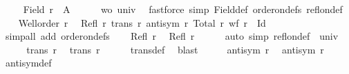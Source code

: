 \begin{isabellebody}
\ \ \isamarkupfalse%
\ {}{\isacharcolon}{\kern0pt}\ {\isachardoublequoteopen}Field\ {\isacharquery}{\kern0pt}r\ {\isacharequal}{\kern0pt}\ A{\isachardoublequoteclose}\isanewline
\ \ \ \ \isamarkupfalse%
\ wo\ univ\ \isamarkupfalse%
\ {\isacharparenleft}{\kern0pt}fastforce\ simp{\isacharcolon}{\kern0pt}\ Field{\isacharunderscore}{\kern0pt}def\ order{\isacharunderscore}{\kern0pt}on{\isacharunderscore}{\kern0pt}defs\ refl{\isacharunderscore}{\kern0pt}on{\isacharunderscore}{\kern0pt}def{\isacharparenright}{\kern0pt}\isanewline
\ \ \isamarkupfalse%
\ {\isacartoucheopen}Well{\isacharunderscore}{\kern0pt}order\ r{\isacartoucheclose}\ \isamarkupfalse%
\ {\isachardoublequoteopen}Refl\ r{\isachardoublequoteclose}\ {\isachardoublequoteopen}trans\ r{\isachardoublequoteclose}\ {\isachardoublequoteopen}antisym\ r{\isachardoublequoteclose}\ {\isachardoublequoteopen}Total\ r{\isachardoublequoteclose}\ {\isachardoublequoteopen}wf\ {\isacharparenleft}{\kern0pt}r\ {\isacharminus}{\kern0pt}\ Id{\isacharparenright}{\kern0pt}{\isachardoublequoteclose}\isanewline
\ \ \ \ \isamarkupfalse%
\ {\isacharparenleft}{\kern0pt}simp{\isacharunderscore}{\kern0pt}all\ add{\isacharcolon}{\kern0pt}\ order{\isacharunderscore}{\kern0pt}on{\isacharunderscore}{\kern0pt}defs{\isacharparenright}{\kern0pt}\isanewline
\ \ \isamarkupfalse%
\ {\isacartoucheopen}Refl\ r{\isacartoucheclose}\ \isamarkupfalse%
\ {\isachardoublequoteopen}Refl\ {\isacharquery}{\kern0pt}r{\isachardoublequoteclose}\isanewline
\ \ \ \ \isamarkupfalse%
\ {\isacharparenleft}{\kern0pt}auto\ simp{\isacharcolon}{\kern0pt}\ refl{\isacharunderscore}{\kern0pt}on{\isacharunderscore}{\kern0pt}def\ {}\ univ{\isacharparenright}{\kern0pt}\isanewline
\ \ \isamarkupfalse%
\ \isamarkupfalse%
\ {\isacartoucheopen}trans\ r{\isacartoucheclose}\ \isamarkupfalse%
\ {\isachardoublequoteopen}trans\ {\isacharquery}{\kern0pt}r{\isachardoublequoteclose}\isanewline
\ \ \ \ \isamarkupfalse%
\ trans{\isacharunderscore}{\kern0pt}def\ \isamarkupfalse%
\ blast\isanewline
\ \ \isamarkupfalse%
\ \isamarkupfalse%
\ {\isacartoucheopen}antisym\ r{\isacartoucheclose}\ \isamarkupfalse%
\ {\isachardoublequoteopen}antisym\ {\isacharquery}{\kern0pt}r{\isachardoublequoteclose}\isanewline
\ \ \ \ \isamarkupfalse%
\ antisym{\isacharunderscore}{\kern0pt}def\ \isamarkupfalse%

\end{isabellebody}
